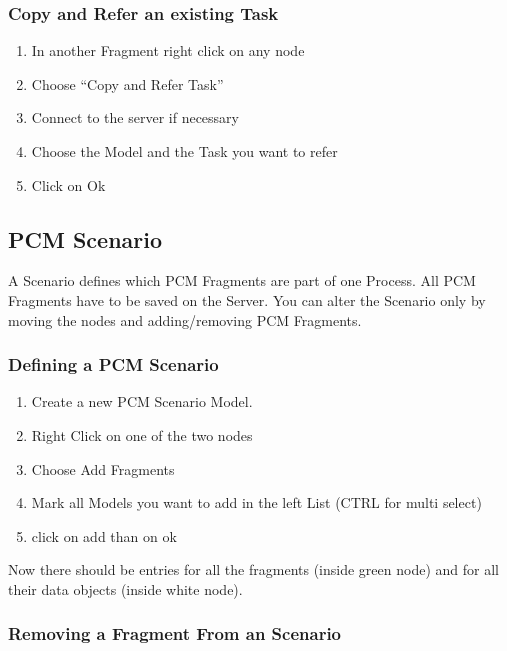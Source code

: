 \documentclass{acm_proc_article-sp}
\begin{document}
%
%
\subsubsection{Copy and Refer an existing
Task}\label{copy-and-refer-an-existing-task}

\begin{enumerate}
\def\labelenumi{\arabic{enumi}.}
\itemsep1pt\parskip0pt
\item
  In another Fragment right click on any node
\item
  Choose ``Copy and Refer Task''
\item
  Connect to the server if necessary
\item
  Choose the Model and the Task you want to refer
\item
  Click on Ok
\end{enumerate}

%
%
\subsection{PCM Scenario}\label{pcm-scenario}
A Scenario defines which PCM Fragments are part of one Process. All PCM
Fragments have to be saved on the Server. You can alter the Scenario
only by moving the nodes and adding/removing PCM Fragments.

%
%
\subsubsection{Defining a PCM Scenario}\label{defining-a-pcm-scenario}

\begin{enumerate}
\def\labelenumi{\arabic{enumi}.}
\itemsep1pt\parskip0pt
\item
  Create a new PCM Scenario Model.
\item
  Right Click on one of the two nodes
\item
  Choose Add Fragments
\item
  Mark all Models you want to add in the left List (CTRL for multi
  select)
\item
  click on add than on ok
\end{enumerate}

Now there should be entries for all the fragments (inside green node)
and for all their data objects (inside white node).

\subsubsection{Removing a Fragment From an
Scenario}\label{removing-a-fragment-from-an-scenario}
\end{document}
